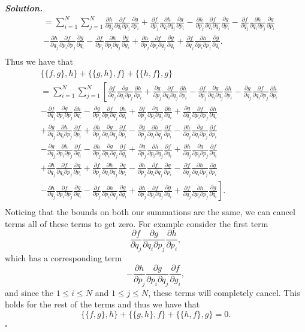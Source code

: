 \documentclass[12pt]{report}
\newenvironment{solution}[1][\it{Solution}]{\textbf{#1. } }{$\square$}
\newcommand{\pp}[2]{\frac{\partial #1}{\partial #2}} %
\begin{document}
\begin{solution}
\begin{align*}
        &=\sum_{i=1}^N\sum_{j=1}^N \pp{h}{q_j}\pp{f}{q_i\partial p_j}\pp{g}{p_i} + \pp{f}{p_j}\pp{h}{q_i\partial q_j}\pp{g}{p_i} - \pp{h}{p_j}\pp{f}{q_i\partial q_j}\pp{g}{p_i}-\pp{f}{q_j}\pp{h}{q_i\partial p_j}\pp{g}{p_i}\\
        &-\pp{h}{q_j}\pp{f}{p_i\partial p_j}\pp{g}{q_i} - \pp{f}{p_j}\pp{h}{p_i \partial q_j}\pp{g}{g_i} + \pp{h}{p_j}\pp{f}{p_i\partial q_j}\pp{g}{q_i} + \pp{f}{q_j}\pp{h}{p_i \partial p_j}\pp{g}{q_i}.\\
    \end{align*}
    Thus we have that
    \begin{align*}
        &\{\{f,g\},h\} + \{\{g,h\},f\} + \{\{h,f\},g\}\\ 
        &=\sum_{i=1}^N\sum_{j=1}^N \left[ \pp{f}{q_j}\pp{g}{q_i\partial p_j}\pp{h}{p_i} + \pp{g}{p_j}\pp{f}{q_i\partial q_j}\pp{h}{p_i} - \pp{f}{p_j}\pp{g}{q_i\partial q_j}\pp{h}{p_i}-\pp{g}{q_j}\pp{f}{q_i\partial p_j}\pp{h}{p_i} \right.\\
        &-\pp{f}{q_j}\pp{g}{p_i\partial p_j}\pp{h}{q_i} - \pp{g}{p_j}\pp{f}{p_i \partial q_j}\pp{h}{g_i} + \pp{f}{p_j}\pp{g}{p_i\partial q_j}\pp{h}{q_i} + \pp{g}{q_j}\pp{f}{p_i \partial p_j}\pp{h}{q_i}\\
        &+\pp{g}{q_j}\pp{h}{q_i\partial p_j}\pp{f}{p_i} + \pp{h}{p_j}\pp{g}{q_i\partial q_j}\pp{f}{p_i} - \pp{g}{p_j}\pp{h}{q_i\partial q_j}\pp{f}{p_i}-\pp{h}{q_j}\pp{g}{q_i\partial p_j}\pp{f}{p_i}\\
        &-\pp{g}{q_j}\pp{h}{p_i\partial p_j}\pp{f}{q_i} - \pp{h}{p_j}\pp{g}{p_i \partial q_j}\pp{f}{g_i} + \pp{g}{p_j}\pp{h}{p_i\partial q_j}\pp{f}{q_i} + \pp{h}{q_j}\pp{g}{p_i \partial p_j}\pp{f}{q_i}\\
        &+\pp{h}{q_j}\pp{f}{q_i\partial p_j}\pp{g}{p_i} + \pp{f}{p_j}\pp{h}{q_i\partial q_j}\pp{g}{p_i} - \pp{h}{p_j}\pp{f}{q_i\partial q_j}\pp{g}{p_i}-\pp{f}{q_j}\pp{h}{q_i\partial p_j}\pp{g}{p_i}\\
        &\left. -\pp{h}{q_j}\pp{f}{p_i\partial p_j}\pp{g}{q_i} - \pp{f}{p_j}\pp{h}{p_i \partial q_j}\pp{g}{g_i} + \pp{h}{p_j}\pp{f}{p_i\partial q_j}\pp{g}{q_i} + \pp{f}{q_j}\pp{h}{p_i \partial p_j}\pp{g}{q_i} \right].\\
    \end{align*}
    Noticing that the bounds on both our summations are the same, we can cancel terms all of these terms to get zero. For example consider the first term 
    \[ \pp{f}{q_j}\pp{g}{q_i\partial p_j}\pp{h}{p_i}, \]
    which has a corresponding term
    \[ -\pp{h}{p_j}\pp{g}{p_i \partial q_j}\pp{f}{g_i}, \]
    and since the $1 \leq i \leq N$ and $1 \leq j \leq N$, these terms will completely cancel. This holds for the rest of the terms and thus we have that
    \[ \{\{f,g\},h\} + \{\{g,h\},f\} + \{\{h,f\},g\} = 0.\] 
\end{solution}
\end{document}
